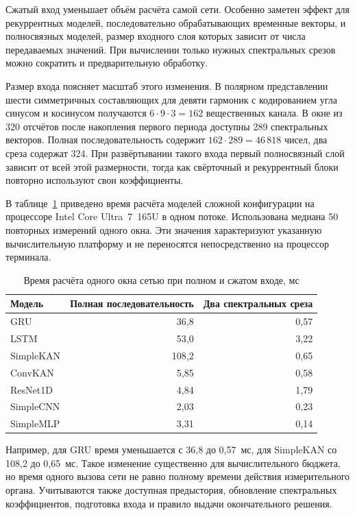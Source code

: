 Сжатый вход уменьшает объём расчёта самой сети.
Особенно заметен эффект для рекуррентных моделей,
последовательно обрабатывающих временные векторы,
и полносвязных моделей, размер входного слоя которых
зависит от числа передаваемых значений.
При вычислении только нужных спектральных срезов
можно сократить и предварительную обработку.

Размер входа поясняет масштаб этого изменения.
В полярном представлении шести симметричных составляющих
для девяти гармоник с кодированием угла синусом и косинусом
получаются $6\cdot9\cdot3=162$ вещественных канала.
В окне из 320 отсчётов после накопления первого периода
доступны 289 спектральных векторов. Полная последовательность
содержит $162\cdot289=46\,818$ чисел, два среза содержат 324.
При развёртывании такого входа первый полносвязный слой
зависит от всей этой размерности, тогда как свёрточный
и рекуррентный блоки повторно используют свои коэффициенты.

В таблице~\ref{tab:ch4_input_latency} приведено время
расчёта моделей сложной конфигурации на процессоре
Intel Core Ultra~7~165U в одном потоке.
Использована медиана 50 повторных измерений одного окна.
Эти значения характеризуют указанную вычислительную платформу
и не переносятся непосредственно на процессор терминала.

\begin{table}[htbp]
\centering\small
\caption{Время расчёта одного окна сетью при полном и сжатом входе, мс}
\label{tab:ch4_input_latency}
\renewcommand{\arraystretch}{1.2}
\begin{tabular}{@{}lrr@{}}
\toprule
Модель & Полная последовательность & Два спектральных среза \\
\midrule
GRU & 36,8 & 0,57 \\
LSTM & 53,0 & 3,22 \\
SimpleKAN & 108,2 & 0,65 \\
ConvKAN & 5,85 & 0,58 \\
ResNet1D & 4,84 & 1,79 \\
SimpleCNN & 2,03 & 0,23 \\
SimpleMLP & 3,31 & 0,14 \\
\bottomrule
\end{tabular}
\end{table}

Например, для GRU время уменьшается с 36,8 до 0,57~мс,
для SimpleKAN со 108,2 до 0,65~мс.
Такое изменение существенно для вычислительного бюджета,
но время одного вызова сети не равно полному времени
действия измерительного органа.
Учитываются также доступная предыстория, обновление
спектральных коэффициентов, подготовка входа и правило
выдачи окончательного решения.

